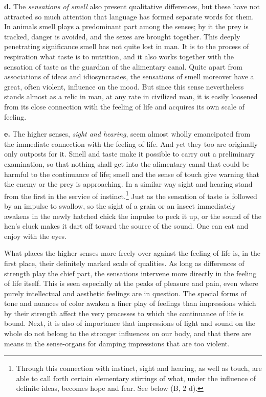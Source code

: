 \documentclass[12pt,a4paper]{book}
\newcommand{\opage}[1]{\marginnote{\footnotesize\textit{[#1]}}}
\begin{document}
\textbf{d.} The \emph{sensations of smell} also present qualitative
differences, but these have not attracted so much attention that
language has formed separate words for them. In animals smell plays a
predominant part among the senses; by it the prey is tracked, danger is
avoided, and the sexes are brought together. This deeply penetrating
significance smell has not quite lost in man. It is to the process of
respiration what taste is to nutrition, and it also works together with
the sensation of taste as the guardian of the alimentary canal. Quite
apart from associations of ideas and idiosyncrasies, the sensations of
smell moreover have a great, often violent, influence on the mood. But
since this sense nevertheless stands almost as a relic in man, at any
rate in civilized man, it is easily loosened from its close connection
with the feeling of life and acquires its own scale of feeling.

\textbf{e.} The higher senses, \emph{sight and hearing}, seem almost
wholly emancipated from the immediate connection with the feeling of
life. And yet they too are originally only outposts for it. Smell and
taste make it possible to carry out a preliminary examination, so that
nothing shall get into the alimentary canal that could be harmful to the
continuance of life; smell and the sense of touch give warning that the
enemy or the prey is approaching. In a similar way sight and hearing
stand from the first in the service of
instinct.\footnote{Through this connection with instinct, sight and
hearing, as well as touch, are able to call forth certain elementary
stirrings of what, under the influence of definite ideas, becomes hope
and fear. See below (B, 2 d).} Just as the sensation of taste is
followed by an impulse to swallow, so the sight of a grain or an insect
immediately awakens in the newly hatched chick the impulse to peck it
up, or the sound of the hen's cluck makes it dart off toward the source
of the sound. One can eat and enjoy with the eyes.

What places the higher senses more freely over against the feeling of
life is, in the first place, their definitely marked scale of qualities.
As long as differences of strength play the chief part,
\opage{277}the sensations intervene more directly in the feeling of life
itself. This is seen especially at the peaks of pleasure and pain, even
where purely intellectual and aesthetic feelings are in question. The
special forms of tone and nuances of color awaken a finer play of
feelings than impressions which by their strength affect the very
processes to which the continuance of life is bound. Next, it is also
of importance that impressions of light and sound on the whole do not
belong to the stronger influences on our body, and that there are means
in the sense-organs for damping impressions that are too violent.
\end{document}
